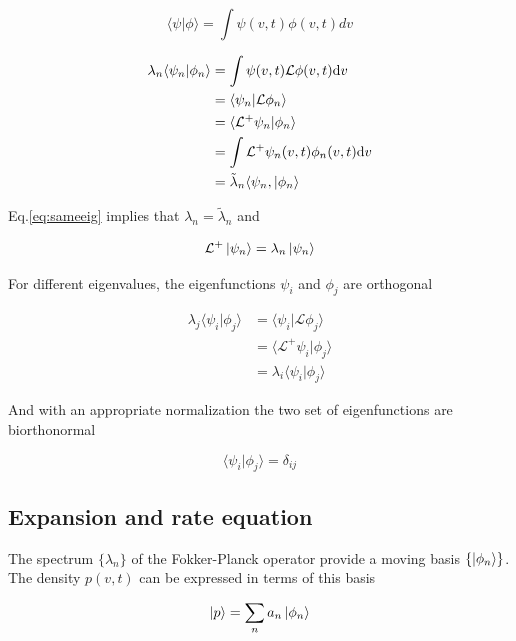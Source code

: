 \documentclass[12pt,twoside]{report}
\def \dd  {{\rm d}}
\begin{document}
\begin{equation}
\label{eq:innerproduct}
\langle\psi|\phi\rangle=\int\psi(v,t)\phi(v,t)dv
\end{equation}

\begin{align}
\lambda_n\langle\psi_n|\phi_n\rangle &=\int\psi(v,t)\mathcal{L}\phi(v,t)\dd v  \nonumber \\
&=\langle\psi_n|\mathcal{L}\phi_n\rangle \nonumber \\
&=\langle\mathcal{L}^+\psi_n|\phi_n\rangle  \nonumber \\
&=\int\mathcal{L}^+\psi_n(v,t)\phi_n(v,t)\dd v \nonumber \\
&=\tilde{\lambda}_n\langle\psi_n,|\phi_n\rangle \label{eq:sameeig}
\end{align}

Eq.\eqref{eq:sameeig} implies that $\lambda_n=\tilde{\lambda}_n$ and

\begin{equation}
\label{eq:fokkerplanckoperatordega2}
\mathcal{L}^+\ket{\psi_n}=\lambda_n\ket{\psi_n}
\end{equation}


For different eigenvalues, the eigenfunctions $\psi_i$ and $\phi_j$ are orthogonal

\begin{align}
\lambda_j\langle\psi_i|\phi_j\rangle
&=\langle\psi_i|\mathcal{L}\phi_j\rangle \nonumber \\
&=\langle\mathcal{L}^+\psi_i|\phi_j\rangle  \nonumber \\
&=\lambda_i\langle\psi_i|\phi_j\rangle \label{eq:lorthogonal}
\end{align}

And with an appropriate normalization the two set of eigenfunctions are biorthonormal

\begin{equation}
\label{eq:dij}
\langle\psi_i|\phi_j\rangle=\delta_{ij}
\end{equation}



\subsection{Expansion and rate equation}
The spectrum $\{\lambda_n\}$ of the Fokker-Planck operator provide a moving basis $ \{\ket{\phi_n}\}$. The density $p(v,t)$ can be expressed in terms of this basis

\begin{equation}
\label{eq:p}
\ket{p}=\sum_na_n\ket{\phi_n}
\end{equation}
\end{document}
